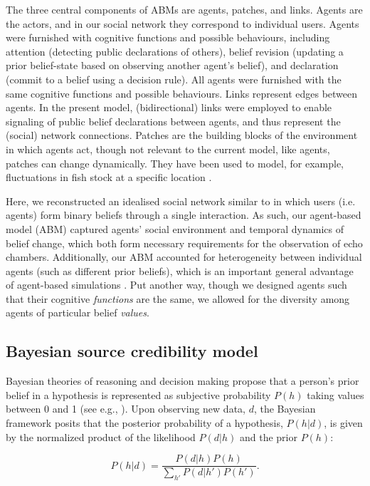 \documentclass[fleqn,10pt]{wlscirep}
\begin{document}
The three central components of ABMs are agents, patches, and links. Agents are the actors, and in our social network they correspond to individual users. Agents were furnished with cognitive functions and possible behaviours, including attention (detecting public declarations of others), belief revision (updating a prior belief-state based on observing another agent’s belief), and declaration (commit to a belief using a decision rule). All agents were furnished with the same cognitive functions and possible behaviours. Links represent edges between agents. In the present model, (bidirectional) links were employed to enable signaling of public belief declarations between agents, and thus represent the (social) network connections. Patches are the building blocks of the environment in which agents act, though not relevant to the current model, like agents, patches can change dynamically. They have been used to model, for example, fluctuations in fish stock at a specific location \cite{bailey2018computational}. 

Here, we reconstructed an idealised social network similar to \cite{pilditch2017opinion, madsen2018large} in which users (i.e. agents) form binary beliefs through a single interaction. As such, our agent-based model (ABM) captured agents' social environment and temporal dynamics of belief change, which both form necessary requirements for the observation of echo chambers. Additionally, our ABM accounted for heterogeneity between individual agents (such as different prior beliefs), which is an important general advantage of agent-based simulations \cite{wilensky2015introduction}. Put another way, though we designed agents such that their cognitive \textit{functions} are the same, we allowed for the diversity among agents of particular belief \textit{values}.

\subsection*{Bayesian source credibility model}
Bayesian theories of reasoning and decision making propose that a person's prior belief in a hypothesis is represented as subjective probability \(P(h)\) taking values between 0 and 1 (see e.g., \cite{hahn2007rationality, oaksford2007bayesian}). Upon observing new data, \(d\), the Bayesian framework posits that the posterior probability of a hypothesis, \(P(h|d)\), is given by the normalized product of the likelihood \(P(d|h)\) and the prior \(P(h)\):

\begin{equation}
    P(h|d) = \frac{P(d|h)P(h)}{\sum_{h'}P(d|h')P(h')}.              
\end{equation}
\end{document}
